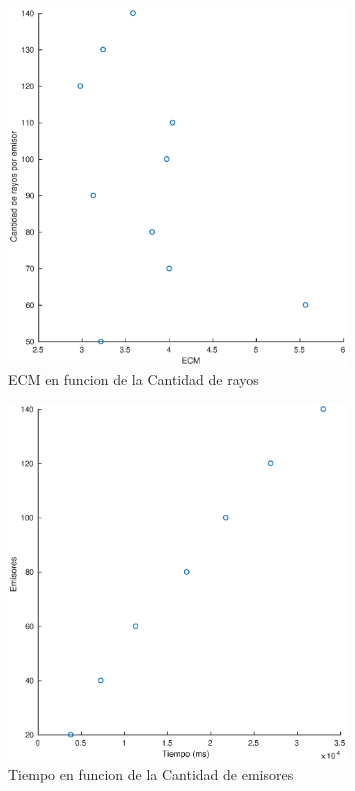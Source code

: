 \begin{figure}[H]
	\centering	\includegraphics[width=0.8\textwidth]{img/cantrayos_ecm}
	\caption{ECM en funcion de la Cantidad de rayos}
	\label{fig:cantrayos_eps}
\end{figure}


\begin{figure}[H]
	\centering	\includegraphics[width=0.8\textwidth]{img/emi_tiempo}
	\caption{Tiempo en funcion de la Cantidad de emisores}
	\label{fig:emi_tiempo}
\end{figure}


